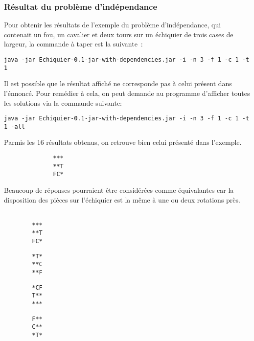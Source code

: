 \documentclass[a4paper,11pt]{article}
\begin{document}
        \subsubsection{Résultat du problème d'indépendance}
            Pour obtenir les résultats de l'exemple du problème d'indépendance, qui contenait un fou, un cavalier et deux tours sur un échiquier de trois cases de largeur, la commande à taper est la suivante~:
            \begin{verbatim}
java -jar Echiquier-0.1-jar-with-dependencies.jar -i -n 3 -f 1 -c 1 -t 1
            \end{verbatim}
            Il est possible que le résultat affiché ne corresponde pas à celui présent dans l'énnoncé.  Pour remédier à cela, on peut demande au programme d'afficher toutes les solutions via la commande suivante:
            \begin{verbatim}
java -jar Echiquier-0.1-jar-with-dependencies.jar -i -n 3 -f 1 -c 1 -t 1 -all
            \end{verbatim}
            Parmis les 16 résultats obtenus, on retrouve bien celui présenté dans l'exemple.
            \begin{verbatim}
              ***
              **T
              FC*
            \end{verbatim}
            \begin{tcolorbox}[title=Remarques :]
                Beaucoup de réponses pourraient être considérées comme équivalantes car la disposition des pièces sur l'échiquier est la même à une ou deux rotations près.\\\\
                \begin{minipage}{.2\linewidth}
                  \begin{verbatim}
        ***
        **T
        FC*
                  \end{verbatim}
                \end{minipage}
                \hfill
                \begin{minipage}{.2\linewidth}
                  \begin{verbatim}
        *T*
        **C
        **F
                  \end{verbatim}
                \end{minipage}
                \hfill
                \begin{minipage}{.2\linewidth}
                  \centering
                  \begin{verbatim}
        *CF
        T**
        ***
                  \end{verbatim}
                \end{minipage}
                \hfill
                \begin{minipage}{.2\linewidth}
                  \centering
                  \begin{verbatim}
        F**
        C**
        *T*
                  \end{verbatim}
                \end{minipage}
            \end{tcolorbox}
\end{document}
